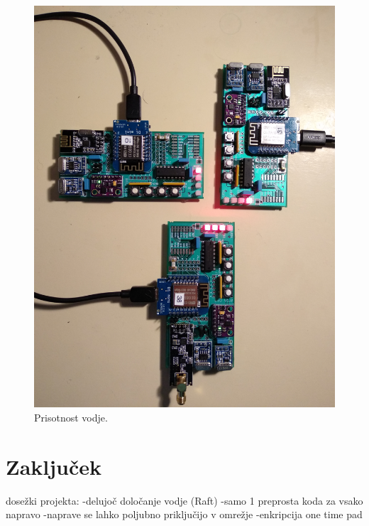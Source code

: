 \documentclass[runningheads]{llncs}
\begin{document}
\begin{figure}
  \includegraphics[width=\linewidth]{one_leader.jpg}
  \caption{Prisotnost vodje.}
  \label{fig:one_leader}
\end{figure}

\section{Zaključek}
dosežki projekta:
-delujoč določanje vodje (Raft)
-samo 1 preprosta koda za vsako napravo
-naprave se lahko poljubno priključijo v omrežje
-enkripcija one time pad
\end{document}
